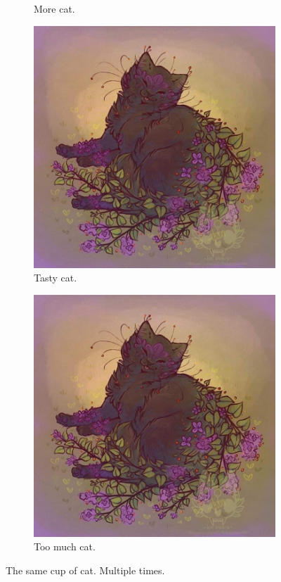 \documentclass{article}
\begin{document}
\begin{figure}[h!]
\begin{subfigure}[b]{0.2\linewidth}
    \caption{More cat.}
  \end{subfigure}
  \begin{subfigure}[b]{0.2\linewidth}
    \includegraphics[width=\linewidth]{cat.jpg}
    \caption{Tasty cat.}
  \end{subfigure}
  \begin{subfigure}[b]{0.5\linewidth}
    \includegraphics[width=\linewidth]{cat.jpg}
    \caption{Too much cat.}
  \end{subfigure}
  \caption{The same cup of cat. Multiple times.}
  \label{fig:cat3}
\end{figure}

\begin{appendix}
  \listoffigures
  \listoftables
\end{appendix}
\end{document}

